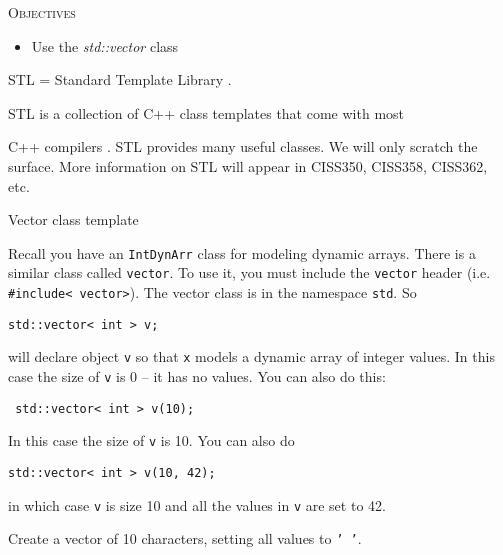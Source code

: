 \newpage{}

\textsc{Objectives}

\begin{itemize}
\item
  Use the \emph{std::vector} class
\end{itemize}

\newpage{}

STL = Standard Template Library .

STL is a collection of C++ class templates that come with most

C++ compilers . STL provides many useful classes. We will only scratch
the surface. More information on STL will appear in CISS350, CISS358,
CISS362, etc.

Vector class template

Recall you have an \texttt{IntDynArr} class for modeling dynamic arrays.
There is a similar class called \texttt{vector}. To use it, you must include the \texttt{vector} header (i.e. \verb!#include< vector>!). The vector class is in the namespace \texttt{std}. So
\begin{center}
\verb!std::vector< int > v;!
\end{center}
will declare object \texttt{v} so that \texttt{x} models a dynamic array of
integer values. In this case the size of \texttt{v} is 0 -- it has no
values. You can also do this:
\begin{center}
\texttt{ std::vector< int > v(10);}
\end{center}
In this case the size of \texttt{v} is 10. You can also do
\begin{center}
\texttt{std::vector< int > v(10, 42);}
\end{center}
in which case \texttt{v} is size 10 and all the values in \texttt{v} are set
to 42.

\begin{ex}Create a vector of 10 characters, setting all values to \texttt{' '}.
\end{ex}

\newpage{}

